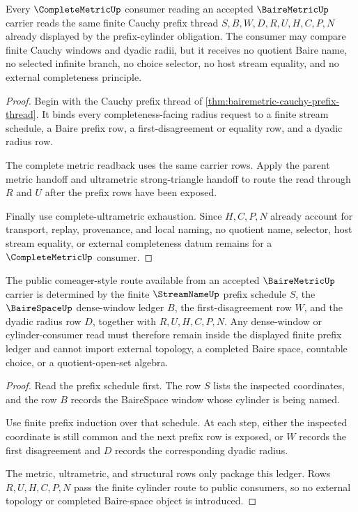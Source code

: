 \begin{theorem}
\label{thm:bairemetric-complete-metric-readback}
Every $\CompleteMetricUp$ consumer reading an accepted $\BaireMetricUp$ carrier reads the same finite Cauchy prefix thread $S,B,W,D,R,U,H,C,P,N$ already displayed by the prefix-cylinder obligation. The consumer may compare finite Cauchy windows and dyadic radii, but it receives no quotient Baire name, no selected infinite branch, no choice selector, no host stream equality, and no external completeness principle.
\end{theorem}
\begin{proof}
Begin with the Cauchy prefix thread of \autoref{thm:bairemetric-cauchy-prefix-thread}. It binds every completeness-facing radius request to a finite stream schedule, a Baire prefix row, a first-disagreement or equality row, and a dyadic radius row.

The complete metric readback uses the same carrier rows. Apply the parent metric handoff and ultrametric strong-triangle handoff to route the read through $R$ and $U$ after the prefix rows have been exposed.

Finally use complete-ultrametric exhaustion. Since $H,C,P,N$ already account for transport, replay, provenance, and local naming, no quotient name, selector, host stream equality, or external completeness datum remains for a $\CompleteMetricUp$ consumer.
\end{proof}

\begin{theorem}
\label{thm:bairemetric-streamname-comeager-ledger}
The public comeager-style route available from an accepted $\BaireMetricUp$ carrier is determined by the finite $\StreamNameUp$ prefix schedule $S$, the $\BaireSpaceUp$ dense-window ledger $B$, the first-disagreement row $W$, and the dyadic radius row $D$, together with $R,U,H,C,P,N$. Any dense-window or cylinder-consumer read must therefore remain inside the displayed finite prefix ledger and cannot import external topology, a completed Baire space, countable choice, or a quotient-open-set algebra.
\end{theorem}
\begin{proof}
Read the prefix schedule first. The row $S$ lists the inspected coordinates, and the row $B$ records the BaireSpace window whose cylinder is being named.

Use finite prefix induction over that schedule. At each step, either the inspected coordinate is still common and the next prefix row is exposed, or $W$ records the first disagreement and $D$ records the corresponding dyadic radius.

The metric, ultrametric, and structural rows only package this ledger. Rows $R,U,H,C,P,N$ pass the finite cylinder route to public consumers, so no external topology or completed Baire-space object is introduced.
\end{proof}

